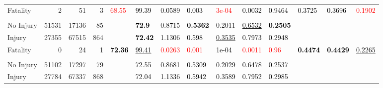 \documentclass[]{elsarticle} %
\begin{document}
\begin{table}
{\begin{tabular}[t]{lrrrllllllllll}
Fatality & 2 & 51 & 3 & \multirow{-3}{*}{\raggedright\arraybackslash \textcolor{red}{68.55}} & \textcolor{black}{99.39} & \textcolor{black}{0.0589} & \textcolor{black}{0.003} & \textcolor{red}{3e-04} & \textcolor{black}{0.0032} & \textcolor{black}{0.9464} & \multirow{-3}{*}{\raggedright\arraybackslash \textcolor{black}{0.3725}} & \multirow{-3}{*}{\raggedright\arraybackslash \textcolor{black}{0.3696}} & \multirow{-3}{*}{\raggedright\arraybackslash \textcolor{red}{0.1902}}\\
\cmidrule{1-14}
\addlinespace[0.3em]
\multicolumn{14}{l}{\textbf{Model 2}}\\
\hspace{1em}No Injury & 51531 & 17136 & 85 &  & \textcolor{black}{\textbf{72.9}} & \textcolor{black}{0.8715} & \textcolor{black}{\textbf{0.5362}} & \textcolor{black}{0.2011} & \textcolor{black}{\underline{0.6532}} & \textcolor{black}{\textbf{0.2505}} &  &  & \\

\hspace{1em}Injury & 27355 & 67515 & 864 &  & \textcolor{black}{\textbf{72.42}} & \textcolor{black}{1.1306} & \textcolor{black}{0.598} & \textcolor{black}{\underline{0.3535}} & \textcolor{black}{0.7973} & \textcolor{black}{0.2948} &  &  & \\

Fatality & 0 & 24 & 1 & \multirow{-3}{*}{\raggedright\arraybackslash \textcolor{black}{\textbf{72.36}}} & \textcolor{black}{\underline{99.41}} & \textcolor{red}{0.0263} & \textcolor{red}{0.001} & \textcolor{black}{1e-04} & \textcolor{red}{0.0011} & \textcolor{red}{0.96} & \multirow{-3}{*}{\raggedright\arraybackslash \textcolor{black}{\textbf{0.4474}}} & \multirow{-3}{*}{\raggedright\arraybackslash \textcolor{black}{\textbf{0.4429}}} & \multirow{-3}{*}{\raggedright\arraybackslash \textcolor{black}{\underline{0.2265}}}\\
\cmidrule{1-14}
\addlinespace[0.3em]
\multicolumn{14}{l}{\textbf{Model 3}}\\
\hspace{1em}No Injury & 51102 & 17297 & 79 &  & \textcolor{black}{72.55} & \textcolor{black}{0.8681} & \textcolor{black}{0.5309} & \textcolor{black}{0.2029} & \textcolor{black}{0.6478} & \textcolor{black}{0.2537} &  &  & \\

\hspace{1em}Injury & 27784 & 67337 & 868 &  & \textcolor{black}{72.04} & \textcolor{black}{1.1336} & \textcolor{black}{0.5942} & \textcolor{black}{0.3589} & \textcolor{black}{0.7952} & \textcolor{black}{0.2985} &  &  & \\


\end{tabular}}
\end{table}
\end{document}
